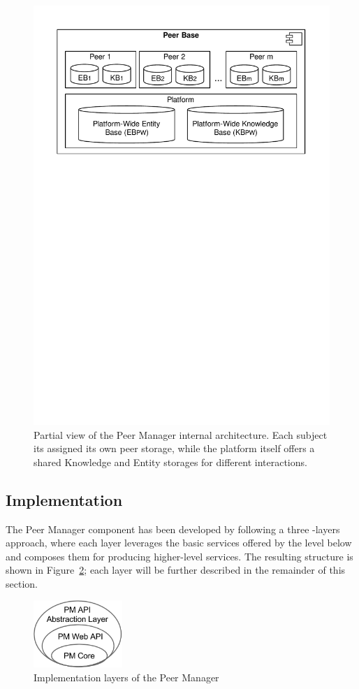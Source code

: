 \begin{figure}[t]
	\centering
	\includegraphics[width=0.65\linewidth]{figures/peerBase-diagram.pdf}
	\caption{Partial view of the Peer Manager internal architecture. Each subject its assigned its own peer storage, while the platform itself offers a shared Knowledge and Entity storages for different interactions.}
	\label{fig:peerManagerPlatform}
\end{figure}




\subsection{Implementation}

The Peer Manager component has been developed by following a three -layers approach, where each layer leverages the basic services offered by the level below and composes them for producing higher-level services. The resulting structure is shown in Figure~\ref{fig:pm-component-layers}; each layer will be further described in the remainder of this section. 

\begin{figure}[htbp]
\centering
\includegraphics[width=0.3\textwidth]{figures/pm-component-layers.png}
\caption{Implementation layers of the Peer Manager}
\label{fig:pm-component-layers}
\end{figure}



